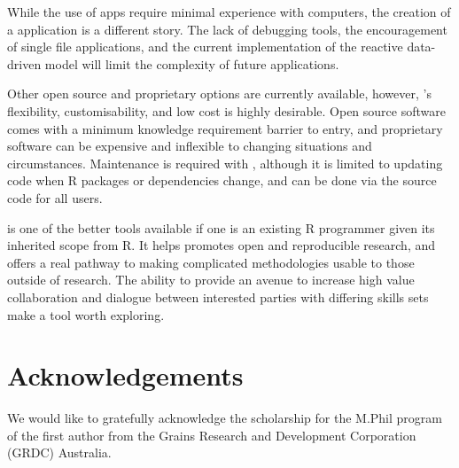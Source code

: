 While the use of  apps require minimal experience with computers, the creation of a  application is a different story.  The lack of debugging tools, the encouragement of single file applications, and the current implementation of the reactive data-driven model will limit the complexity of future applications.

Other open source and proprietary options are currently available, however, 's flexibility, customisability, and low cost is highly desirable.  Open source software comes with a minimum knowledge requirement barrier to entry, and proprietary software can be expensive and inflexible to changing situations and circumstances. Maintenance is required with , although it is limited to updating code when R packages or dependencies change, and can be done via the source code for all users. 

 is one of the better tools available if one is an existing R programmer given its inherited scope from R.  It helps promotes open and reproducible research, and offers a real pathway to making complicated methodologies usable to those outside of research.  The ability to provide an avenue to increase high value collaboration and dialogue between interested parties with differing skills sets make  a tool worth exploring.

\section{Acknowledgements}
We would like to gratefully acknowledge the scholarship for the M.Phil program of the first author from the Grains Research and Development Corporation (GRDC) Australia.



\address{Peter Kasprzak\\
  University of Adelaide\\
  School of Agriculture Food and Wine, PMB 1, Glen Osmond, SA 5064\\
  Australia\\
  }

\address{Lachlan Mitchell\\
  University of Adelaide\\
  School of Agriculture Food and Wine, PMB 1, Glen Osmond, SA 5064\\
  Australia\\
  }

